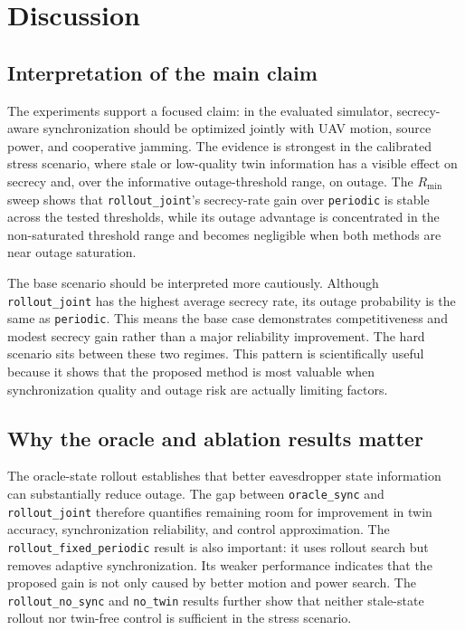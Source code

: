 \section{Discussion}
\label{sec:discussion}

\subsection{Interpretation of the main claim}

The experiments support a focused claim: in the evaluated simulator, secrecy-aware synchronization should be optimized jointly with UAV motion, source power, and cooperative jamming. The evidence is strongest in the calibrated stress scenario, where stale or low-quality twin information has a visible effect on secrecy and, over the informative outage-threshold range, on outage. The $R_{\min}$ sweep shows that \texttt{rollout\_joint}'s secrecy-rate gain over \texttt{periodic} is stable across the tested thresholds, while its outage advantage is concentrated in the non-saturated threshold range and becomes negligible when both methods are near outage saturation.

The base scenario should be interpreted more cautiously. Although \texttt{rollout\_joint} has the highest average secrecy rate, its outage probability is the same as \texttt{periodic}. This means the base case demonstrates competitiveness and modest secrecy gain rather than a major reliability improvement. The hard scenario sits between these two regimes. This pattern is scientifically useful because it shows that the proposed method is most valuable when synchronization quality and outage risk are actually limiting factors.

\subsection{Why the oracle and ablation results matter}

The oracle-state rollout establishes that better eavesdropper state information can substantially reduce outage. The gap between \texttt{oracle\_sync} and \texttt{rollout\_joint} therefore quantifies remaining room for improvement in twin accuracy, synchronization reliability, and control approximation. The \texttt{rollout\_fixed\_periodic} result is also important: it uses rollout search but removes adaptive synchronization. Its weaker performance indicates that the proposed gain is not only caused by better motion and power search. The \texttt{rollout\_no\_sync} and \texttt{no\_twin} results further show that neither stale-state rollout nor twin-free control is sufficient in the stress scenario.

